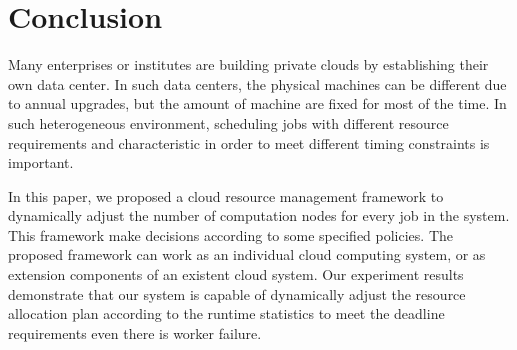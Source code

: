 \section{Conclusion}\label{sec:conclusion}

Many enterprises or institutes are building private clouds by
establishing their own data center.
In such data centers, the physical machines can be different due to 
annual upgrades,  but the amount of machine are fixed for most of the 
time.
In such heterogeneous environment, scheduling jobs with different 
resource requirements and characteristic in order to meet different 
timing constraints is important.

In this paper, we proposed a cloud resource management framework to
dynamically adjust the number of computation nodes for every job in the
system.
This framework make decisions according to some specified policies.
The proposed framework can work as an individual cloud computing system,
or as extension components of an existent cloud system.
Our experiment results demonstrate that our system is capable of
dynamically adjust the resource allocation plan according to the runtime
statistics to meet the deadline requirements even there is worker
failure.
